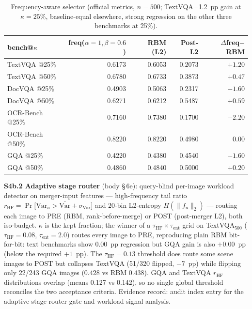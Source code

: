 \begin{table}[ht]
  \centering
  \footnotesize
  \begin{tabular}{@{}l r r r r@{}}
    \toprule
    bench@$\kappa$ & freq($\alpha{=}1,\beta{=}0.6$) & RBM (L2) & Post-L2 & $\Delta$freq$-$RBM \\
    \midrule
    TextVQA   @25\% & 0.6173 & 0.6053 & 0.2073 & $+1.20$ \\
    TextVQA   @50\% & 0.6780 & 0.6733 & 0.3873 & $+0.47$ \\
    DocVQA    @25\% & 0.4903 & 0.5063 & 0.2317 & $-1.60$ \\
    DocVQA    @50\% & 0.6271 & 0.6212 & 0.5487 & $+0.59$ \\
    OCR-Bench @25\% & 0.7160 & 0.7380 & 0.1700 & $-2.20$ \\
    OCR-Bench @50\% & 0.8220 & 0.8220 & 0.4980 & $0.00$ \\
    GQA       @25\% & 0.4220 & 0.4380 & 0.4540 & $-1.60$ \\
    GQA       @50\% & 0.4860 & 0.4840 & 0.5000 & $+0.20$ \\
    \bottomrule
  \end{tabular}
  \caption{Frequency-aware selector (official metrics, $n=500$; TextVQA=1.2~pp
  gain at $\kappa{=}25\%$, baseline-equal elsewhere, strong regression on the
  other three benchmarks at 25\%).}
\end{table}

\noindent\textbf{S4b.2 Adaptive stage router} (body \S\,6e): query-blind
per-image workload detector on merger-input features --- high-frequency tail
ratio $r_{\mathrm{HF}} = \Pr\big[\mathrm{Var}_u > \bar{\mathrm{Var}} +
\sigma_{\mathrm{Var}}\big]$ and 20-bin L2-entropy $H(\|f_u\|_2)$ --- routing
each image to PRE (RBM, rank-before-merge) or POST (post-merger L2),
both iso-budget. $\kappa$ is the kept fraction; the winner of a
$\tau_{\mathrm{HF}}{\times}\tau_{\mathrm{ent}}$ grid on TextVQA$_{500}$
($\tau_{\mathrm{HF}}{=}0.08$, $\tau_{\mathrm{ent}}{=}2.0$) routes every image to
PRE, reproducing plain RBM bit-for-bit: text benchmarks show $0.00$~pp
regression but GQA gain is also $+0.00$~pp (below the required $+1$~pp). The
$\tau_{\mathrm{HF}}{=}0.13$ threshold does route some scene images to POST but
collapses TextVQA (51/320 flipped, $-7$~pp) while flipping only 22/243 GQA
images ($0.428$ vs RBM $0.438$). GQA and TextVQA $r_{\mathrm{HF}}$ distributions
overlap (means 0.127 vs 0.142), so no single global threshold reconciles the two
acceptance criteria. Evidence record: audit index entry for the
adaptive stage-router gate and workload-signal analysis.


